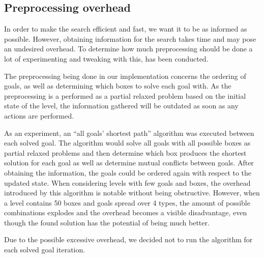 \documentclass[Main]{subfiles}
\begin{document}
\subsection{Preprocessing overhead}
In order to make the search efficient and fast, we want it to be as informed as
possible. However, obtaining information for the search takes time and may pose
an undesired overhead. To determine how much preprocessing should be done a lot
of experimenting and tweaking with this, has been conducted. 

The preprocessing being done in our implementation concerns the ordering of
goals, as well as determining which boxes to solve each goal with. As the
preprocessing is a performed as a partial relaxed problem based on the initial
state of the level, the information gathered will be outdated as soon as any
actions are performed. 

As an experiment, an ``all goals' shortest path'' algorithm was executed between
each solved goal. The algorithm would solve all goals with all possible boxes as
partial relaxed problems and then determine which box produces the shortest
solution for each goal as well as determine mutual conflicts between goals.
After obtaining the information, the goals could be ordered again with respect
to the updated state. When considering levels with few goals and boxes, the
overhead introduced by this algorithm is notable without being obstructive.
However, when a level contains 50 boxes and goals spread over 4 types, the
amount of possible combinations explodes and the overhead becomes a visible
disadvantage, even though the found solution has the potential of being much
better. 

Due to the possible excessive overhead, we decided not to run the algorithm for
each solved goal iteration. 



\end{document}
